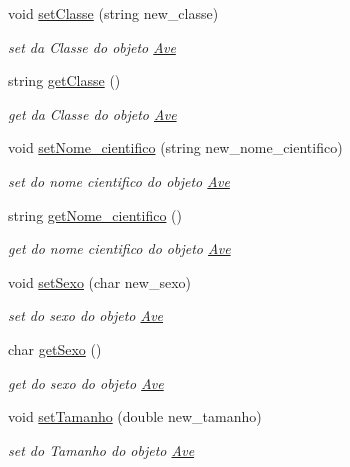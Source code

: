 \begin{DoxyCompactItemize}
void \mbox{\hyperlink{class_ave_a4d79bb3cbee243b1e4542b00eb71ce71}{set\+Classe}} (string new\+\_\+classe)
\begin{DoxyCompactList}\small\item\em set da Classe do objeto \mbox{\hyperlink{class_ave}{Ave}} \end{DoxyCompactList}\item 
string \mbox{\hyperlink{class_ave_a635eb27ef1ef4c9928e133ce3448bfd0}{get\+Classe}} ()
\begin{DoxyCompactList}\small\item\em get da Classe do objeto \mbox{\hyperlink{class_ave}{Ave}} \end{DoxyCompactList}\item 
void \mbox{\hyperlink{class_ave_a60b4ceef85ecc436ef63b6297e779909}{set\+Nome\+\_\+cientifico}} (string new\+\_\+nome\+\_\+cientifico)
\begin{DoxyCompactList}\small\item\em set do nome cientifico do objeto \mbox{\hyperlink{class_ave}{Ave}} \end{DoxyCompactList}\item 
string \mbox{\hyperlink{class_ave_a6e40addf9eb4e33849279157285e774c}{get\+Nome\+\_\+cientifico}} ()
\begin{DoxyCompactList}\small\item\em get do nome cientifico do objeto \mbox{\hyperlink{class_ave}{Ave}} \end{DoxyCompactList}\item 
void \mbox{\hyperlink{class_ave_a75f8147318f338b36058d59a48c42ec8}{set\+Sexo}} (char new\+\_\+sexo)
\begin{DoxyCompactList}\small\item\em set do sexo do objeto \mbox{\hyperlink{class_ave}{Ave}} \end{DoxyCompactList}\item 
char \mbox{\hyperlink{class_ave_aedb2458d9a3ef0c05657aa9d3791167d}{get\+Sexo}} ()
\begin{DoxyCompactList}\small\item\em get do sexo do objeto \mbox{\hyperlink{class_ave}{Ave}} \end{DoxyCompactList}\item 
void \mbox{\hyperlink{class_ave_a86e3ee7da6fec2e19736b9ac253555c7}{set\+Tamanho}} (double new\+\_\+tamanho)
\begin{DoxyCompactList}\small\item\em set do Tamanho do objeto \mbox{\hyperlink{class_ave}{Ave}} \end{DoxyCompactList}\item 

\end{DoxyCompactItemize}
